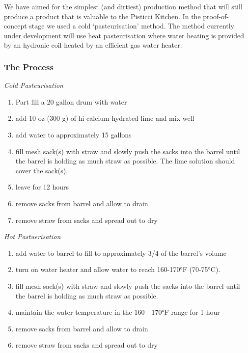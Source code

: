 We have aimed for the simplest (and dirtiest) production method that
will still produce a product that is valuable to the Pisticci Kitchen.
In the proof-of-concept stage we used a cold `pasteurisation' method.
The method currently under development will use heat pasteurisation
where water heating is provided by an hydronic coil heated by an
efficient gas water heater.

\subsubsection{The Process}\label{the-process}

\emph{Cold Pasteurisation}

\begin{enumerate}
\def\labelenumi{\arabic{enumi}.}
\itemsep1pt\parskip0pt
\item
  Part fill a 20 gallon drum with water
\item
  add 10 oz (300 g) of hi calcium hydrated lime and mix well
\item
  add water to approximately 15 gallons
\item
  fill mesh sack(s) with straw and slowly push the sacks into the barrel
  until the barrel is holding as much straw as possible. The lime
  solution should cover the sack(s).
\item
  leave for 12 hours
\item
  remove sacks from barrel and allow to drain
\item
  remove straw from sacks and spread out to dry
\end{enumerate}

\emph{Hot Pastuerisation}

\begin{enumerate}
\def\labelenumi{\arabic{enumi}.}
\itemsep1pt\parskip0pt
\item
  add water to barrel to fill to approximately 3/4 of the barrel's
  volume
\item
  turn on water heater and allow water to reach 160-170°F (70-75°C).
\item
  fill mesh sack(s) with straw and slowly push the sacks into the barrel
  until the barrel is holding as much straw as possible.
\item
  maintain the water temperature in the 160 - 170°F range for 1 hour
\item
  remove sacks from barrel and allow to drain
\item
  remove straw from sacks and spread out to dry
\end{enumerate}

